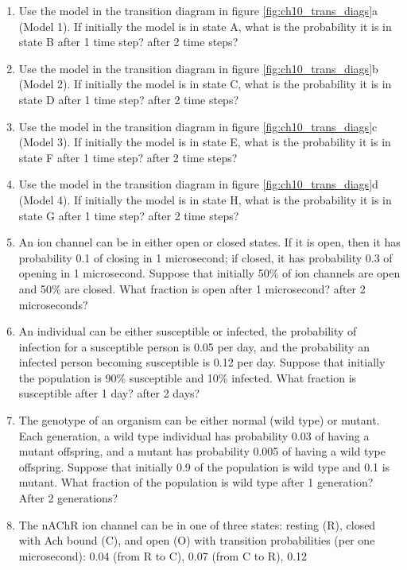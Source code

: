 \documentclass[
  letterpaper,
  DIV=11,
  numbers=noendperiod]{scrreprt}
\begin{document}
\begin{enumerate}
\def\labelenumi{\arabic{enumi}.}
\item
  Use the model in the transition diagram in figure
  \ref{fig:ch10_trans_diags}a (Model 1). If initially the model is in
  state A, what is the probability it is in state B after 1 time step?
  after 2 time steps?
\item
  Use the model in the transition diagram in figure
  \ref{fig:ch10_trans_diags}b (Model 2). If initially the model is in
  state C, what is the probability it is in state D after 1 time step?
  after 2 time steps?
\item
  Use the model in the transition diagram in figure
  \ref{fig:ch10_trans_diags}c (Model 3). If initially the model is in
  state E, what is the probability it is in state F after 1 time step?
  after 2 time steps?
\item
  Use the model in the transition diagram in figure
  \ref{fig:ch10_trans_diags}d (Model 4). If initially the model is in
  state H, what is the probability it is in state G after 1 time step?
  after 2 time steps?
\item
  An ion channel can be in either open or closed states. If it is open,
  then it has probability 0.1 of closing in 1 microsecond; if closed, it
  has probability 0.3 of opening in 1 microsecond. Suppose that
  initially 50\% of ion channels are open and 50\% are closed. What
  fraction is open after 1 microsecond? after 2 microseconds?
\item
  An individual can be either susceptible or infected, the probability
  of infection for a susceptible person is 0.05 per day, and the
  probability an infected person becoming susceptible is 0.12 per day.
  Suppose that initially the population is 90\% susceptible and 10\%
  infected. What fraction is susceptible after 1 day? after 2 days?
\item
  The genotype of an organism can be either normal (wild type) or
  mutant. Each generation, a wild type individual has probability 0.03
  of having a mutant offspring, and a mutant has probability 0.005 of
  having a wild type offspring. Suppose that initially 0.9 of the
  population is wild type and 0.1 is mutant. What fraction of the
  population is wild type after 1 generation? After 2 generations?
\item
  The nAChR ion channel can be in one of three states: resting (R),
  closed with Ach bound (C), and open (O) with transition probabilities
  (per one microsecond): 0.04 (from R to C), 0.07 (from C to R), 0.12

\end{enumerate}
\end{document}
